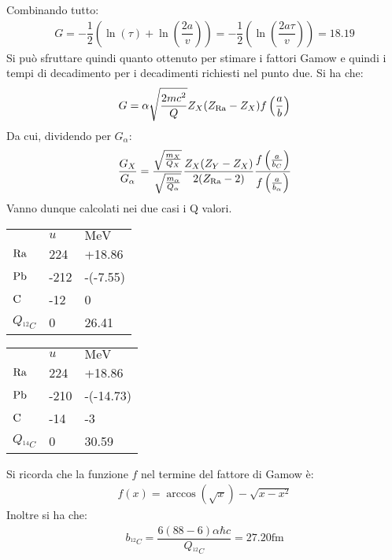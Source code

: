 \documentclass[../main.tex]{subfiles}
\begin{document}
\begin{svol}
			Combinando tutto:
			\begin{gather}
				G=-\dfrac{1}{2}\left(\ln(\tau)+\ln\left(\dfrac{2a}{v}\right)\right)=-\dfrac{1}{2}\left(\ln\left(\dfrac{2a\tau}{v}\right)\right)=18.19
			\end{gather} 
			Si può sfruttare quindi quanto ottenuto per stimare i fattori Gamow e quindi i tempi di decadimento per i decadimenti richiesti nel punto due. Si ha che:
			\begin{gather}
				G=\alpha\sqrt{\dfrac{2mc^{2}}{Q}}Z_{X}(Z_{\mathrm{Ra}}-Z_{X})f\left(\dfrac{a}{b}\right)
			\end{gather} 
			Da cui, dividendo per $ G_{\alpha} $:
			\begin{gather} \dfrac{G_{X}}{G_{\alpha}}=\dfrac{\sqrt{\frac{m_{X}}{Q_{X}}}}{\sqrt{\frac{m_{\alpha}}{Q_{\alpha}}}}\dfrac{Z_{X}(Z_{Y}-Z_{X})}{2(Z_{\mathrm{Ra}}-2)}\dfrac{f\left(\frac{a}{b_{C}}\right)}{f\left(\frac{a}{b_{\alpha}}\right)}
			\end{gather}
			Vanno dunque calcolati nei due casi i Q valori. 
			\begin{center}
				\begin{tabular}{lll}
					& $ \si{u} $ & $ \si{\mega\electronvolt} $ \\
					$ \mathrm{Ra} $  & 224 & +18.86\\
					$ \mathrm{Pb} $  & -212 & -(-7.55) \\
					$ \mathrm{C} $ & -12 & 0 \\\hline
					$ Q_{^{12}C} $ & 0 & 26.41 \\
				\end{tabular}
				\begin{tabular}{lll}
					& $ \si{u} $ & $ \si{\mega\electronvolt} $ \\
					$ \mathrm{Ra} $  & 224 & +18.86\\
					$ \mathrm{Pb} $  & -210 & -(-14.73) \\
					$ \mathrm{C} $ & -14 & -3 \\\hline
					$ Q_{^{14}C} $ & 0 & 30.59 \\
				\end{tabular}
			\end{center}
		Si ricorda che la funzione $ f $ nel termine del fattore di Gamow è: 
		\begin{gather} f(x)=\arccos(\sqrt{x})-\sqrt{x-x^{2}}
		\end{gather}
		Inoltre si ha che:
		\begin{gather} b_{^{12}C}=\dfrac{6(88-6)\alpha\hbar c}{Q_{^{12}C}}=27.20\si{\femto\meter} 

\end{gather}
\end{svol}
\end{document}
